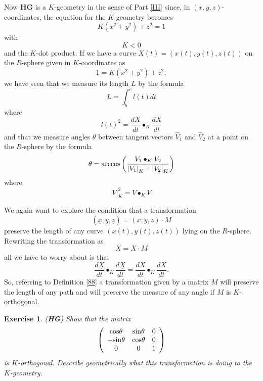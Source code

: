 \documentclass{article}%
\newtheorem{exercise}[theorem]{Exercise}
\begin{document}
Now \textbf{HG} is a $K$-geometry in the sense of Part \ref{III} since, in
$\left(  x,y,z\right)  $-coordinates, the equation for the $K$-geometry
becomes%
\begin{equation}
K\left(  x^{2}+y^{2}\right)  +z^{2}=1 \label{83}%
\end{equation}
with%
\[
K<0
\]
and the $K$-dot product. If we have a curve $X\left(  t\right)  =\left(
x\left(  t\right)  ,y\left(  t\right)  ,z\left(  t\right)  \right)  $ on the
$R$-sphere given in $K$-coordinates as%
\[
1=K\left(  x^{2}+y^{2}\right)  +z^{2},
\]
we have seen that we measure its length $L$ by the formula%
\begin{equation}
L=%
{\displaystyle\int\nolimits_{b}^{e}}
l\left(  t\right)  dt \label{84}%
\end{equation}
where
\begin{equation}
l\left(  t\right)  ^{2}=\frac{dX}{dt}\bullet_{K}\frac{dX}{dt} \label{85}%
\end{equation}
and that we measure angles $\theta$ between tangent vectors $\hat{V}_{1}$ and
$\hat{V}_{2}$ at a point on the $R$-sphere by the formula%
\[
\theta=\mathrm{arccos}\left(  \frac{V_{1}\bullet_{K}V_{2}}{\left\vert
V_{1}\right\vert _{K}\text{\textperiodcentered}\left\vert V_{2}\right\vert
_{K}}\right)
\]
where%
\[
\left\vert V\right\vert _{K}^{2}=V\bullet_{K}V.
\]


We again want to explore the condition that a transformation%
\[
\left(  \underline{x},\underline{y},\underline{z}\right)  =\left(
x,y,z\right)  \cdot M
\]
preserve the length of any curve $\left(  x\left(  t\right)  ,y\left(
t\right)  ,z\left(  t\right)  \right)  $ lying on the $R$-sphere. Rewriting
the transformation as%
\[
\underline{X}=X\cdot M
\]
all we have to worry about is that%
\[
\frac{d\underline{X}}{dt}\bullet_{K}\frac{d\underline{X}}{dt}=\frac{dX}%
{dt}\bullet_{K}\frac{dX}{dt}.
\]
So, referring to Definition \ref{88} a transformation given by a matrix $M$
will preserve the length of any path and will preserve the measure of any
angle if $M$ is $K$-orthogonal.

\begin{exercise}
(\textbf{HG}) Show that the matrix%
\[
\left(
\begin{array}
[c]{ccc}%
\mathrm{cos}\theta & \mathrm{sin}\theta & 0\\
-\mathrm{sin}\theta & \mathrm{cos}\theta & 0\\
0 & 0 & 1
\end{array}
\right)
\]
is $K$-orthogonal. Describe geometrically what this transformation is doing to
the $K$-geometry.
\end{exercise}
\end{document}
